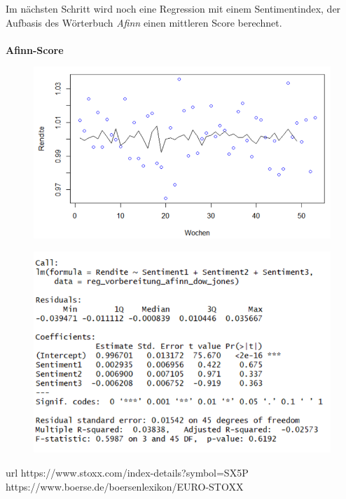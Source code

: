 Im nächsten Schritt wird noch eine Regression mit einem Sentimentindex, der Aufbasis des Wörterbuch \textit{Afinn} einen mittleren Score berechnet.\\
\\
\textbf{Afinn-Score}
 \begin{figure}[H]
	\centering
	\includegraphics[width=1\textwidth]{Pictures/Afinn_plot.png}
\end{figure} 
 \begin{figure}[H]
	\centering
	\includegraphics[width=1\textwidth]{Pictures/afinn_summary.png}
\end{figure} 
url https://www.stoxx.com/index-details?symbol=SX5P
https://www.boerse.de/boersenlexikon/EURO-STOXX

